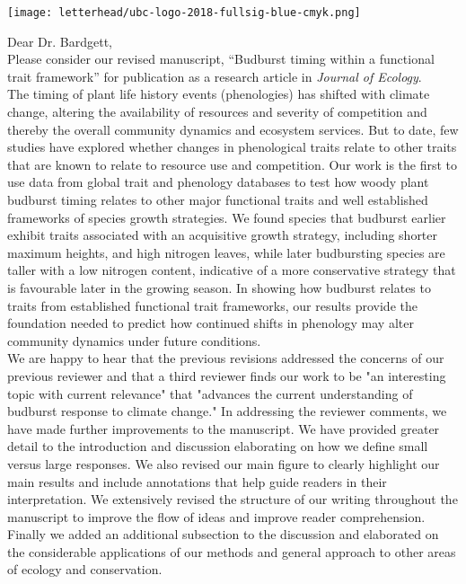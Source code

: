 \documentclass[11pt,a4paper]{article}
\begin{document}
\noindent \texttt{[image: letterhead/ubc-logo-2018-fullsig-blue-cmyk.png]}

\noindent Dear Dr. Bardgett,
\vspace{1.5ex}\\
\noindent Please consider our revised manuscript, ``Budburst timing within a functional trait framework'' for publication as a research article in \emph{Journal of Ecology}. 
\vspace{1.5ex}\\ 
\noindent The timing of plant life history events (phenologies) has shifted with climate change, altering the availability of resources and severity of competition and thereby the overall community dynamics and ecosystem services. But to date, few studies have explored whether changes in phenological traits relate to other traits that are known to relate to resource use and competition. Our work is the first to use data from global trait and phenology databases to test how woody plant budburst timing relates to other major functional traits and well established frameworks of species growth strategies. We found species that budburst earlier exhibit traits associated with an acquisitive growth strategy, including shorter maximum heights, and high nitrogen leaves, while later budbursting species are taller with a low nitrogen content, indicative of a more conservative strategy that is favourable later in the growing season. In showing how budburst relates to traits from established functional trait frameworks, our results provide the foundation needed to predict how continued shifts in phenology may alter community dynamics under future conditions. 
\vspace{1.5ex}\\ 
We are happy to hear that the previous revisions addressed the concerns of our previous reviewer and that a third reviewer finds our work to be "an interesting topic with current relevance" that "advances the current understanding of budburst response to climate change."  In addressing the reviewer comments, we have made further improvements to the manuscript. We have provided greater detail to the introduction and discussion elaborating on how we define small versus large responses. We also revised our main figure to clearly highlight our main results and include annotations that help guide readers in their interpretation. We extensively revised the structure of our writing throughout the manuscript to improve the flow of ideas and improve reader comprehension. Finally we added an additional subsection to the discussion and elaborated on the considerable applications of our methods and general approach to other areas of ecology and conservation.
\end{document}
